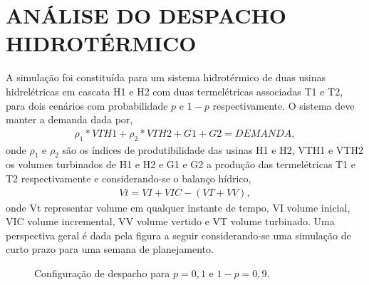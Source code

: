 \documentclass[12pt,fleqn]{article}
\begin{document}
\section{AN\'ALISE DO DESPACHO HIDROT\'ERMICO}
A simula\c c\~ao  foi constitu\'ida para um sistema hidrot\'ermico de duas usinas hidrel\'etricas em cascata
H1 e H2 com duas termel\'etricas associadas T1 e T2, para dois cen\'arios com probabilidade $p$ e $1-p$ respectivamente.
O sistema deve manter a demanda dada por,
{\setlength{\belowdisplayskip}{-4pt}
\begin{align*}
  \displaystyle{\rho}_1*VTH1 + {\rho}_2*VTH2 + G1 + G2 = DEMANDA,
\end{align*}}%
onde $\rho_1$ e $\rho_2$ s\~ao os \'indices de produtibilidade das usinas H1 e H2, VTH1 e VTH2  os volumes turbinados de
H1 e H2 e G1 e G2 a
produ\c c\~ao das termel\'etricas T1 e T2 respectivamente e considerando-se o balan\c co h\'idrico,
\begin{align*}
  \displaystyle Vt = VI + VIC - \left( VT + VV \right), 
\end{align*}
onde Vt representar volume em qualquer instante de tempo, VI volume inicial, VIC volume incremental, VV volume vertido e
VT volume turbinado. Uma perspectiva geral \'e dada pela figura a seguir considerando-se uma simula\c c\~ao de curto prazo para uma semana de planejamento.
\begin{figure}[!htpb]
\centering
	\caption{Configura\c c\~ao de despacho para $p = 0,1$ e $1-p = 0,9$.}
	\label{disp1}
\end{figure}
\end{document}
